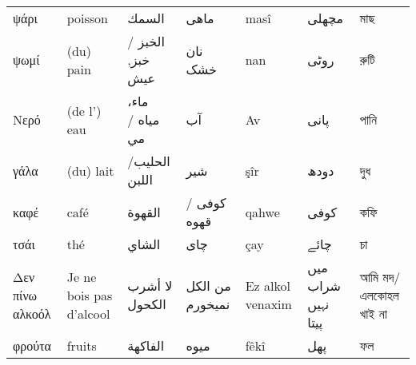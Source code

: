 \begin{longtable}{p{3.5cm} p{3.5cm} p{3.5cm} p{3.5cm} p{3.5cm} p{3.5cm} p{3.5cm} }
 ψάρι                                       & poisson                                                          & السمك                            & ماهی                & masî                       & مچھلی                                                 & মাছ                                         \\
 ψωμί                                       & (du) pain                                                        & الخبز / خبز, عيش                 & نان خشک             & nan                        & روٹی                                                  & রুটি                                        \\
 Νερό                                       & (de l') eau                                                      & ماء، مياه       / مي             & آب                  & Av                         & پانی                                                  & পানি                                        \\
 γάλα                                       & (du) lait                                                        & الحليب/ اللبن                    & شیر                 & şîr                        & دودھ                                                  & দুধ                                         \\
 καφέ                                       & café                                                             & القهوة                           & کوفی / قهوه         & qahwe                      & کوفی                                                  & কফি                                         \\
 τσάι                                       & thé                                                              & الشاي                            & چای                 & çay                        & چائے                                                  & চা                                          \\
 Δεν πίνω αλκοόλ                            & Je ne bois pas d'alcool                                          & لا أشرب الكحول                   & من الکل نمیخورم     & Ez alkol venaxim           & میں شراب نہیں پیتا                                    & আমি মদ/এলকোহল খাই না                        \\
 φρούτα                                     & fruits                                                           & الفاكهة                          & میوه                & fêkî                       & پھل                                                   & ফল                                          \\

\end{longtable}
